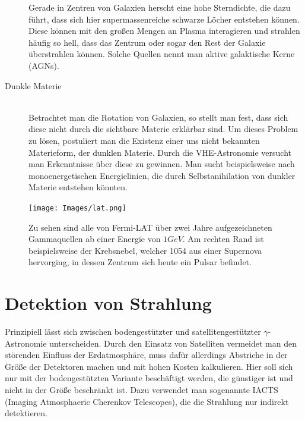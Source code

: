 \begin{description}
Gerade in Zentren von Galaxien herscht eine hohe Sterndichte, die dazu führt, dass sich hier supermassenreiche schwarze Löcher entstehen können. Diese können mit den großen Mengen an Plasma interagieren und strahlen häufig so hell, dass das Zentrum oder sogar den Rest der Galaxie überstrahlen können. Solche Quellen nennt man aktive galaktische Kerne (AGNs).
\item[Dunkle Materie]\hfill \\
Betrachtet man die Rotation von Galaxien, so stellt man fest, dass sich diese nicht durch die sichtbare Materie erklärbar sind. Um dieses Problem zu lösen, postuliert man die Existenz einer uns nicht bekannten Materieform, der dunklen Materie. Durch die VHE-Astronomie versucht man Erkenntnisse über diese zu gewinnen. Man sucht beispielsweise nach monoenergetischen Energielinien, die durch Selbstanihilation von dunkler Materie entstehen könnten.
\end{description}

\begin{figure}[htbp]
\centering
\texttt{[image: Images/lat.png]}
\caption{Zu sehen sind alle von Fermi-LAT über zwei Jahre aufgezeichneten Gammaquellen ab einer Energie von $1\unit{GeV}$. Am rechten Rand ist beispielsweise der Krebsnebel, welcher 1054 aus einer Supernova hervorging, in dessen Zentrum sich heute ein Pulsar befindet. \cite{FermiLAT}}
\label{img:FermiLAT}
\end{figure}


\section{Detektion von Strahlung}
Prinzipiell lässt sich zwischen bodengestützter und satellitengestützter $\gamma$-Astronomie unterscheiden. Durch den Einsatz von Satelliten vermeidet man den störenden Einfluss der Erdatmosphäre, muss dafür allerdings Abstriche in der Größe der Detektoren machen und mit hohen Kosten kalkulieren. Hier soll sich nur mit der bodengestützten Variante beschäftigt werden, die günstiger ist und nicht in der Größe beschränkt ist. Dazu verwendet man sogenannte IACTS (Imaging Atmosphaeric Cherenkov Telescopes), die die Strahlung nur indirekt detektieren.

